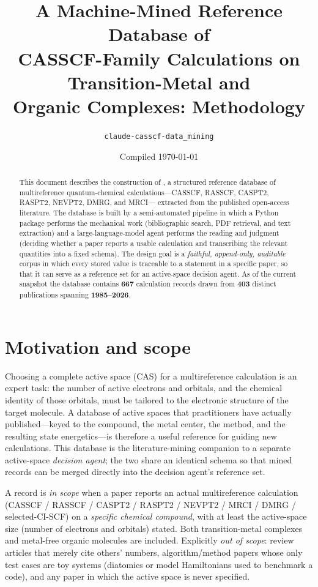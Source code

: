 \documentclass[11pt]{article}
\title{\bfseries A Machine-Mined Reference Database of\\
CASSCF-Family Calculations on Transition-Metal and\\
Organic Complexes: Methodology}
\author{\texttt{claude-casscf-data\_mining}}
\date{Compiled \today}
\newcommand{\col}[1]{\texttt{\detokenize{#1}}}
\begin{document}
\maketitle

\begin{abstract}
\noindent
This document describes the construction of \col{literature.csv}, a
structured reference database of multireference quantum-chemical
calculations---CASSCF, RASSCF, CASPT2, RASPT2, NEVPT2, DMRG, and MRCI---%
extracted from the published open-access literature. The database is built
by a semi-automated pipeline in which a Python package performs the
mechanical work (bibliographic search, PDF retrieval, and text extraction)
and a large-language-model agent performs the reading and judgment
(deciding whether a paper reports a usable calculation and transcribing the
relevant quantities into a fixed schema). The design goal is a
\emph{faithful, append-only, auditable} corpus in which every stored value
is traceable to a statement in a specific paper, so that it can serve as a
reference set for an active-space decision agent. As of the current
snapshot the database contains \textbf{667} calculation records drawn from
\textbf{403} distinct publications spanning \textbf{1985--2026}.
\end{abstract}

\section{Motivation and scope}

Choosing a complete active space (CAS) for a multireference calculation is
an expert task: the number of active electrons and orbitals, and the
chemical identity of those orbitals, must be tailored to the electronic
structure of the target molecule. A database of active spaces that
practitioners have actually published---keyed to the compound, the metal
center, the method, and the resulting state energetics---is therefore a
useful reference for guiding new calculations. This database is the
literature-mining companion to a separate active-space \emph{decision
agent}; the two share an identical schema so that mined records can be
merged directly into the decision agent's reference set.

A record is \emph{in scope} when a paper reports an actual multireference
calculation (CASSCF / RASSCF / CASPT2 / RASPT2 / NEVPT2 / MRCI / DMRG /
selected-CI-SCF) on a \emph{specific chemical compound}, with at least the
active-space size (number of electrons and orbitals) stated. Both
transition-metal complexes and metal-free organic molecules are included.
Explicitly \emph{out of scope}: review articles that merely cite others'
numbers, algorithm/method papers whose only test cases are toy systems
(diatomics or model Hamiltonians used to benchmark a code), and any paper
in which the active space is never specified.
\end{document}
